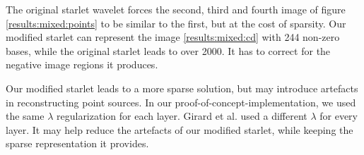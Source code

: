 The original starlet wavelet forces the second, third and fourth image of figure \ref{results:mixed:points} to be similar to the first, but at the cost of sparsity. Our modified starlet can represent the image \ref{results:mixed:cd} with 244 non-zero bases, while the original starlet leads to over 2000. It has to correct for the negative image regions it produces.

Our modified starlet leads to a more sparse solution, but may introduce artefacts in reconstructing point sources. In our proof-of-concept-implementation, we used the same $\lambda$ regularization for each layer. Girard et al.\cite{girard2015sparse} used a different $\lambda$ for every layer. It may help reduce the artefacts of our modified starlet, while keeping the sparse representation it provides.

